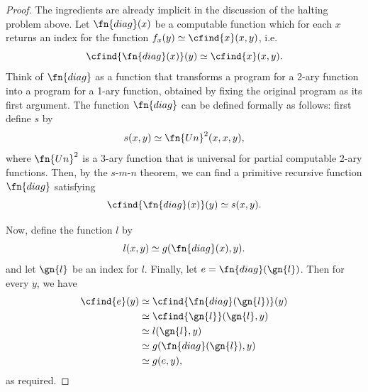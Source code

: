 \documentclass[../../../include/open-logic-section]{subfiles}
\begin{document}
\begin{proof}
The ingredients are already implicit in the discussion of the halting
problem above. Let $\fn{diag}(x)$ be a computable function which for each
$x$ returns an index for the function $f_x(y) \simeq \cfind{x}(x,y)$,
i.e.
\[
\cfind{\fn{diag}(x)}(y) \simeq \cfind{x}(x,y).
\]
Think of $\fn{diag}$ as a function that transforms a program for a 2-ary
function into a program for a 1-ary function, obtained by fixing the
original program as its first argument. The function $\fn{diag}$ can be
defined formally as follows: first define $s$ by
\[
s(x,y) \simeq \fn{Un}^2(x,x,y),
\]
where $\fn{Un}^2$ is a 3-ary function that is universal for partial computable
2-ary functions. Then, by the $s$-$m$-$n$ theorem, we can find a primitive
recursive function $\fn{diag}$ satisfying
\[
\cfind{\fn{diag}(x)}(y) \simeq s(x,y).
\]

Now, define the function $l$ by
\[
l(x,y) \simeq g(\fn{diag}(x),y).
\]
and let $\gn{l}$ be an index for $l$. Finally, let $e = \fn{diag}(\gn{l})$.
Then for every $y$, we have
\begin{align*}
\cfind{e}(y) & \simeq \cfind{\fn{diag}(\gn{l})}(y) \\
& \simeq \cfind{\gn{l}}(\gn{l}, y) \\
& \simeq l(\gn{l}, y) \\
& \simeq g(\fn{diag}(\gn{l}),y) \\
& \simeq g(e, y),
\end{align*}
as required.
\end{proof}
\end{document}
